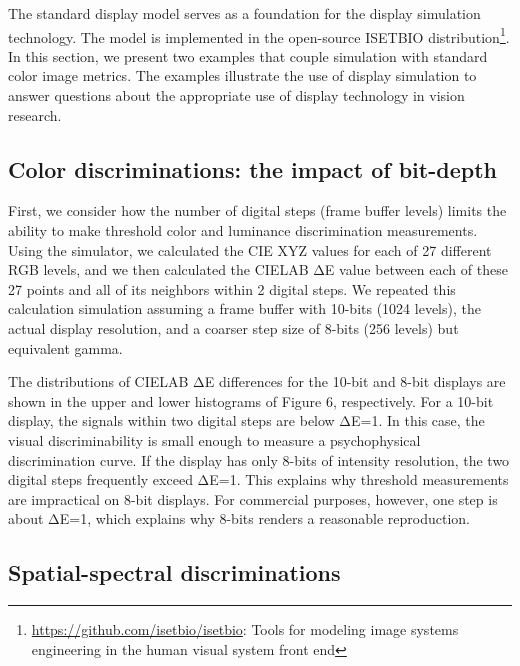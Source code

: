 \documentclass[
  letterpaper,
]{book}
\begin{document}
The standard display model serves as a foundation for the display
simulation technology. The model is implemented in the open-source
ISETBIO distribution\footnote{\url{https://github.com/isetbio/isetbio}:
  Tools for modeling image systems engineering in the human visual
  system front end}. In this section, we present two examples that
couple simulation with standard color image metrics. The examples
illustrate the use of display simulation to answer questions about the
appropriate use of display technology in vision research.

\subsection{\texorpdfstring{\textbf{Color discriminations: the impact of
bit-depth}}{Color discriminations: the impact of bit-depth}}\label{color-discriminations-the-impact-of-bit-depth}

First, we consider how the number of digital steps (frame buffer levels)
limits the ability to make threshold color and luminance discrimination
measurements. Using the simulator, we calculated the CIE XYZ values for
each of 27 different RGB levels, and we then calculated the CIELAB ΔE
value between each of these 27 points and all of its neighbors within 2
digital steps. We repeated this calculation simulation assuming a frame
buffer with 10-bits (1024 levels), the actual display resolution, and a
coarser step size of 8-bits (256 levels) but equivalent gamma.

The distributions of CIELAB ΔE differences for the 10-bit and 8-bit
displays are shown in the upper and lower histograms of Figure 6,
respectively. For a 10-bit display, the signals within two digital steps
are below ΔE=1. In this case, the visual discriminability is small
enough to measure a psychophysical discrimination curve. If the display
has only 8-bits of intensity resolution, the two digital steps
frequently exceed ΔE=1. This explains why threshold measurements are
impractical on 8-bit displays. For commercial purposes, however, one
step is about ΔE=1, which explains why 8-bits renders a reasonable
reproduction.

\subsection{\texorpdfstring{\textbf{Spatial-spectral
discriminations}}{Spatial-spectral discriminations}}\label{spatial-spectral-discriminations}
\end{document}
